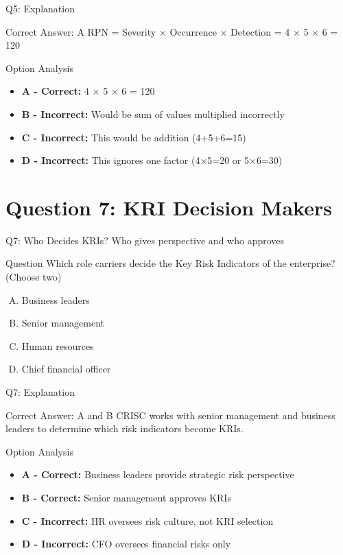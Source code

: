 \documentclass{beamer}
\begin{document}
	\begin{frame}{Q5: Explanation}
		\begin{block}{Correct Answer: A}
			RPN = Severity × Occurrence × Detection = 4 × 5 × 6 = 120
		\end{block}
		\begin{block}{Option Analysis}
			\begin{itemize}
				\item \textbf{A - Correct:} 4 × 5 × 6 = 120
				\item \textbf{B - Incorrect:} Would be sum of values multiplied incorrectly
				\item \textbf{C - Incorrect:} This would be addition (4+5+6=15)
				\item \textbf{D - Incorrect:} This ignores one factor (4×5=20 or 5×6=30)
			\end{itemize}
		\end{block}
	\end{frame}
	

	
	\section{Question 7: KRI Decision Makers}
	
	\begin{frame}{Q7: Who Decides KRIs? Who gives perspective and who approves}
		\begin{block}{Question}
			Which role carriers decide the Key Risk Indicators of the enterprise? (Choose two)
		\end{block}
		\begin{enumerate}[(A)]
			\item Business leaders
			\item Senior management
			\item Human resources
			\item Chief financial officer
		\end{enumerate}
	\end{frame}
	
	\begin{frame}{Q7: Explanation}
		\begin{block}{Correct Answer: A and B}
			CRISC works with senior management and business leaders to determine which risk indicators become KRIs.
		\end{block}
		\begin{block}{Option Analysis}
			\begin{itemize}
				\item \textbf{A - Correct:} Business leaders provide strategic risk perspective
				\item \textbf{B - Correct:} Senior management approves KRIs
				\item \textbf{C - Incorrect:} HR oversees risk culture, not KRI selection
				\item \textbf{D - Incorrect:} CFO oversees financial risks only
			\end{itemize}
		\end{block}
	\end{frame}
	
\end{document}
